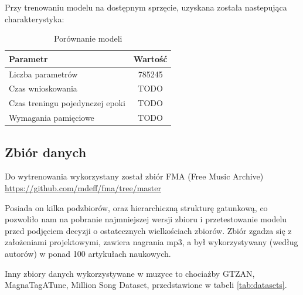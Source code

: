 Przy trenowaniu modelu na dostępnym sprzęcie, uzyskana została nastepująca charakterystyka:
\begin{table}[h]

    \centering

    \begin{tabular}{|l|c|}
        \hline
        \textbf{Parametr}               & \textbf{Wartość} \\
        \hline
        Liczba parametrów               & 785245           \\
        Czas wnioskowania               & TODO             \\
        Czas treningu pojedynczej epoki & TODO             \\
        Wymagania pamięciowe            & TODO             \\

        \hline
    \end{tabular}

    \caption{Porównanie modeli}
    \label{tab:modele}

\end{table}


\subsection{Zbiór danych}
Do wytrenowania wykorzystany został zbiór FMA (Free Music Archive) \url{https://github.com/mdeff/fma/tree/master} \cite{fma_dataset}

Posiada on kilka podzbiorów, oraz hierarchiczną strukturę gatunkową, co pozwoliło nam na pobranie najmniejszej wersji zbioru i przetestowanie modelu przed podjęciem decyzji o ostatecznych wielkościach zbiorów. Zbiór zgadza się z założeniami projektowymi, zawiera nagrania mp3, a był wykorzystywany (według autorów) w ponad 100 artykułach naukowych.


Inny zbiory danych wykorzystywane w muzyce to chociażby GTZAN, MagnaTagATune, Million Song Dataset, przedstawione w tabeli \ref{tab:datasets}.

